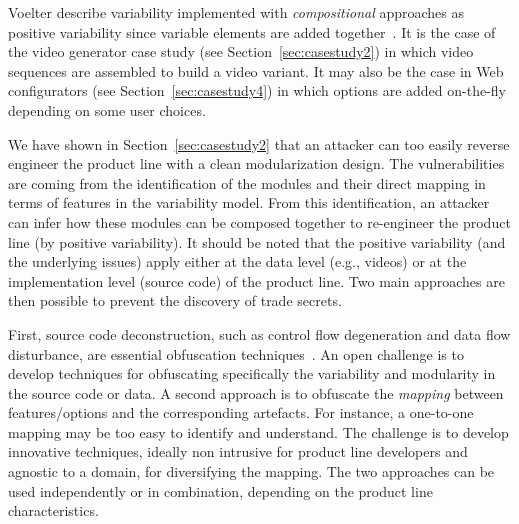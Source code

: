  Voelter \etal describe variability implemented with \emph{compositional} approaches as positive variability since variable elements are added together~\cite{voelter2007}. 
It is the case of the video generator case study (see Section~\ref{sec:casestudy2}) in which video sequences are assembled to build a video variant. 
It may also be the case in Web configurators (see Section~\ref{sec:casestudy4}) in which options are added on-the-fly depending on some user choices. 

We have shown in Section~\ref{sec:casestudy2} that an attacker can too easily reverse engineer the product line with a clean modularization design. 
The vulnerabilities are coming from the identification of the modules and their direct mapping in terms of features in the variability model. From this identification, an attacker can infer how these modules can be composed together to re-engineer the product line (\ie by positive variability). 
It should be noted that the positive variability (and the underlying issues) apply either at the data level (e.g., videos) or at the implementation level (source code) of the product line. Two main approaches are then possible to prevent the discovery of trade secrets. 

First, source code deconstruction, such as control flow degeneration and data flow disturbance, are essential obfuscation techniques~\cite{collberg1997taxonomy}. 
 An open challenge is to develop techniques for obfuscating specifically the variability and modularity in the source code or data.  
%
 A second approach is to obfuscate the \emph{mapping} between features/options and the corresponding artefacts. 
For instance, a one-to-one mapping may be too easy to identify and understand. 
The challenge is to develop innovative techniques, ideally non intrusive for product line developers and agnostic to a domain, for diversifying the mapping. 
The two approaches can be used independently or in combination, depending on the product line characteristics. %

